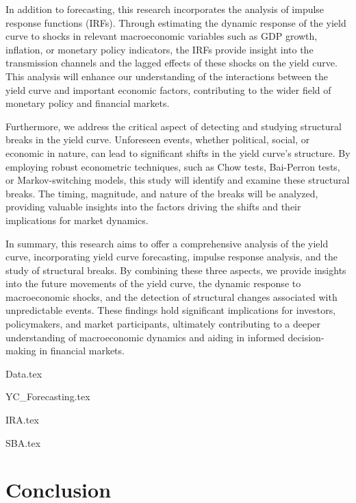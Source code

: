 \documentclass{vegaarticle}
\begin{document}
        In addition to forecasting, this research incorporates the analysis of impulse response functions (IRFs).
        Through estimating the dynamic response of the yield curve to shocks in relevant macroeconomic variables such as
        GDP growth, inflation, or monetary policy indicators, the IRFs provide insight into the transmission channels
        and the lagged effects of these shocks on the yield curve. This analysis will enhance our understanding of the
        interactions between the yield curve and important economic factors, contributing to the wider field of monetary
        policy and financial markets.
        
        Furthermore, we address the critical aspect of detecting and studying structural breaks in the yield curve.
        Unforeseen events, whether political, social, or economic in nature, can lead to significant shifts in the yield
        curve's structure. By employing robust econometric techniques, such as Chow tests, Bai-Perron tests, or
        Markov-switching models, this study will identify and examine these structural breaks. The timing, magnitude,
        and nature of the breaks will be analyzed, providing valuable insights into the factors driving the shifts and
        their implications for market dynamics.
        
        In summary, this research aims to offer a comprehensive analysis of the yield curve, incorporating yield curve
        forecasting, impulse response analysis, and the study of structural breaks. By combining these three aspects,
        we provide insights into the future movements of the yield curve, the dynamic response to macroeconomic shocks,
        and the detection of structural changes associated with unpredictable events. These findings hold significant
        implications for investors, policymakers, and market participants, ultimately contributing to a deeper
        understanding of macroeconomic dynamics and aiding in informed decision-making in financial markets.


    {Data.tex}

    {YC_Forecasting.tex}

    {IRA.tex}

    {SBA.tex}

    \section{Conclusion}

\end{document}
